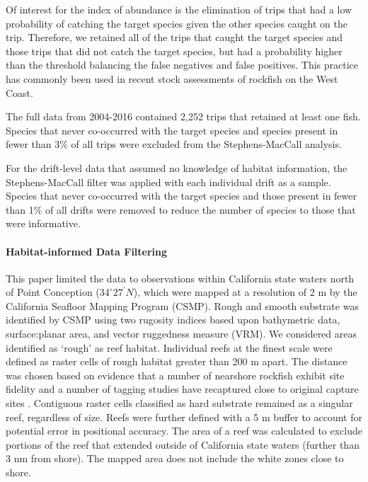 \documentclass[
  authoryear,
  preprint,
  3p]{elsarticle}
\let\oldparagraph\paragraph
\renewcommand{\paragraph}[1]{\oldparagraph{#1}\mbox{}}
\begin{document}
Of interest for the index of abundance is the elimination of trips that
had a low probability of catching the target species given the other
species caught on the trip. Therefore, we retained all of the trips that
caught the target species and those trips that did not catch the target
species, but had a probability higher than the threshold balancing the
false negatives and false positives. This practice has commonly been
used in recent stock assessments of rockfish on the West Coast.

The full data from 2004-2016 contained 2,252 trips that retained at
least one fish. Species that never co-occurred with the target species
and species present in fewer than 3\% of all trips were excluded from
the Stephens-MacCall analysis.

For the drift-level data that assumed no knowledge of habitat
information, the Stephens-MacCall filter was applied with each
individual drift as a sample. Species that never co-occurred with the
target species and those present in fewer than 1\% of all drifts were
removed to reduce the number of species to those that were informative.

\hypertarget{habitat-informed-data-filtering}{%
\paragraph{Habitat-informed Data
Filtering}\label{habitat-informed-data-filtering}}

This paper limited the data to observations within California state
waters north of Point Conception (\(34^\circ 27^\prime N\)), which were
mapped at a resolution of 2 m by the California Seafloor Mapping Program
(CSMP). Rough and smooth substrate was identified by CSMP using two
rugosity indices based upon bathymetric data, surface:planar area, and
vector ruggedness measure (VRM). We considered areas identified as
`rough' as reef habitat. Individual reefs at the finest scale were
defined as raster cells of rough habitat greater than 200 m apart. The
distance was chosen based on evidence that a number of nearshore
rockfish exhibit site fidelity and a number of tagging studies have
recaptured close to original capture sites
\citep{Lea:1999:BAM, Matthews:1985:SSM, Hannah:2011:SF, Hannah:2012:UNC}.
Contiguous raster cells classified as hard substrate remained as a
singular reef, regardless of size. Reefs were further defined with a 5 m
buffer to account for potential error in positional accuracy. The area
of a reef was calculated to exclude portions of the reef that extended
outside of California state waters (further than 3 nm from shore). The
mapped area does not include the white zones close to shore.
\end{document}
